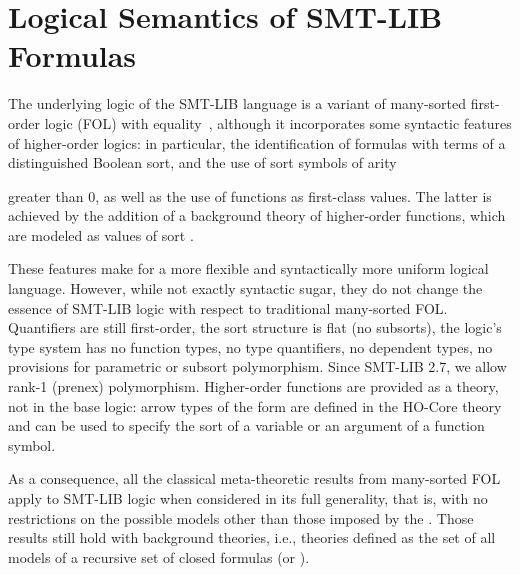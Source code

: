 



\chapter{Logical Semantics of SMT-LIB Formulas} \label{chap:logical-semantics}
\thispagestyle{empty}



The underlying logic of the SMT-LIB language is a variant of many-sorted 
first-order logic (FOL) with equality~\cite{Man-MSL-93,Gal-86,Hen-01},
although it incorporates some syntactic  features 
of higher-order logics:
in particular, the identification of formulas with terms 
of a distinguished Boolean sort, and the use of sort symbols of arity 
\begin{newver}
greater than 0,
as well as the use of functions as first-class values.
The latter is achieved by the addition of a background theory 
of higher-order functions,
which are modeled as values of sort .
\end{newver}


These features make for a more flexible and syntactically more uniform 
logical language.
However, while not exactly syntactic sugar, they do not change the essence 
of SMT-LIB logic with respect to traditional many-sorted FOL.
Quantifiers are still first-order, the sort structure is flat (no subsorts),
the logic's type system has no function types, 
no type quantifiers, no dependent types,
no provisions for parametric or subsort polymorphism.
Since SMT-LIB 2.7, we allow rank-1 (prenex) polymorphism.
Higher-order functions are provided as a theory, not in the base logic:
arrow types of the form  are defined
in the HO-Core theory and can be used to specify the sort of a variable
or an argument of a function symbol.

As a consequence, all the classical meta-theoretic results from many-sorted 
FOL apply to SMT-LIB logic when considered in its full generality, that is,
with no restrictions on the possible models other than those imposed 
by the  .
Those results still hold with  
background theories, i.e., theories defined as the set of all models
of a recursive set of closed formulas (or ).
\medskip

